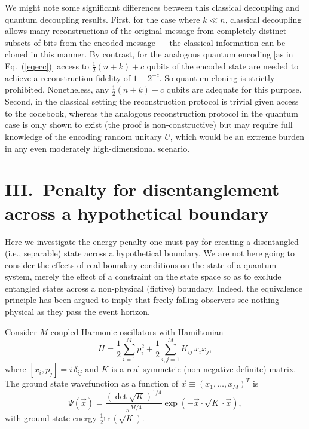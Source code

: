 \documentclass[aps,showpacs,prl,12pt]{revtex4}
\begin{document}
We might note some significant differences between this classical
decoupling and quantum decoupling results. First, for the case where
$k\ll n$, classical decoupling allows many reconstructions of the
original message from completely distinct subsets of bits from the
encoded message --- the classical information can be cloned in this
manner. By contrast, for the analogous quantum encoding [as in
Eq.~(\ref{eqecc})] access to $\frac{1}{2}(n+k)+c$ qubits of the
encoded state are needed to achieve a reconstruction fidelity of
$1-2^{-c}$. So quantum cloning is strictly prohibited. Nonetheless, any
$\frac{1}{2}(n+k)+c$ qubits are adequate for this purpose. Second, in
the classical setting the reconstruction protocol is trivial given access
to the codebook, whereas the analogous reconstruction protocol in the
quantum case is only shown to exist (the proof is non-constructive)
but may require full knowledge of the encoding random unitary $U$,
which would be an extreme burden in any even moderately
high-dimensional scenario.

\section{III.\ Penalty for disentanglement across a hypothetical boundary}

Here we investigate the energy penalty one must pay for creating
a disentangled (i.e., separable) state across a hypothetical boundary. 
We are not here going to consider the effects of real boundary conditions
on the state of a quantum system, merely the effect of a constraint
on the state space so as to exclude entangled states across a
non-physical (fictive) boundary. Indeed, the equivalence principle has
been argued \cite{Susskind93app} to imply that freely falling observers
see nothing physical as they pass the event horizon.

Consider $M$ coupled Harmonic oscillators with Hamiltonian
\begin{equation}
H=\frac{1}{2}\sum_{i=1}^M p_i^2 + \frac{1}{2}\sum_{i,j=1}^M
K_{ij}\, x_i x_j,
\label{HOHam}
\end{equation}
where $[x_i,p_j]=i\, \delta_{ij}$ and $K$ is a real symmetric (non-negative
definite) matrix. The ground state wavefunction as a function of
$\vec x\equiv (x_1,\ldots,x_M)^T$ is
\begin{equation}
\Psi(\vec x)=\frac{(\det \sqrt{K})^{1/4}}{\pi^{M/4}}
\exp(-\vec x\cdot \sqrt{K}\cdot \vec x),
\end{equation}
with ground state energy $\frac{1}{2} \text{tr}\,( \sqrt{K})$.
\end{document}
